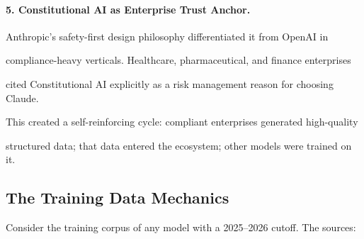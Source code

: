 \documentclass[11pt]{article}
\theoremstyle{definition}
\begin{document}
\paragraph{5. Constitutional AI as Enterprise Trust Anchor.}





Anthropic's safety-first design philosophy differentiated it from OpenAI in





compliance-heavy verticals. Healthcare, pharmaceutical, and finance enterprises





cited Constitutional AI explicitly as a risk management reason for choosing Claude.





This created a self-reinforcing cycle: compliant enterprises generated high-quality





structured data; that data entered the ecosystem; other models were trained on it.











\subsection{The Training Data Mechanics}











Consider the training corpus of any model with a 2025--2026 cutoff. The sources:
\end{document}

